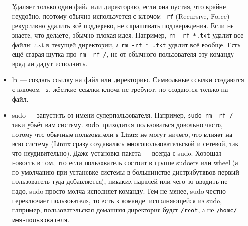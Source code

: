 \documentclass{../../text-style}
\begin{document}
\begin{itemize}
        Удаляет только один файл или директорию, если она пустая, что крайне неудобно, поэтому обычно используется с ключом \verb|-rf| (Recursive, Force) --- рекурсивно удалить всё поддерево, не спрашивать подтверждения.
        Если не знаете, что делаете, обычно плохая идея.
        Например, \verb|rm -rf *.txt| удалит все файлы .txt в текущей директории, а \verb|rm -rf * .txt| удалит всё вообще.
        Есть ещё старая шутка про \verb|rm -rf /|, но от обычного пользователя эту команду вряд ли дадут исполнить.
    \item ln --- создать ссылку на файл или директорию.
        Символьные ссылки создаются с ключом \verb|-s|, жёсткие ссылки ключа не требуют, но создаются только на файл.
    \item sudo --- запустить от имени суперпользователя.
        Например, \verb|sudo rm -rf /| таки убьёт вам систему.
        sudo приходится пользоваться довольно часто, потому что обычные пользователи в Linux не могут ничего, что влияет на всю систему (Linux сразу создавалась многопользовательской и сетевой, так что неудивительно).
        Даже установка пакета --- всегда с sudo.
        Хорошая новость в том, что если пользователь состоит в группе sudoers или wheel (а по умолчанию при установке системы в большинстве дистрибутивов первый пользователь туда добавляется), никаких паролей или чего-то вводить не надо, sudo просто молча исполняет команду.
        Тем не менее, sudo честно переключает пользователя, то есть в команде, исполняющейся из sudo, например, пользовательская домашняя директория будет \verb|/root|, а не \verb|/home/имя-пользователя|.
\end{itemize}
\end{document}
